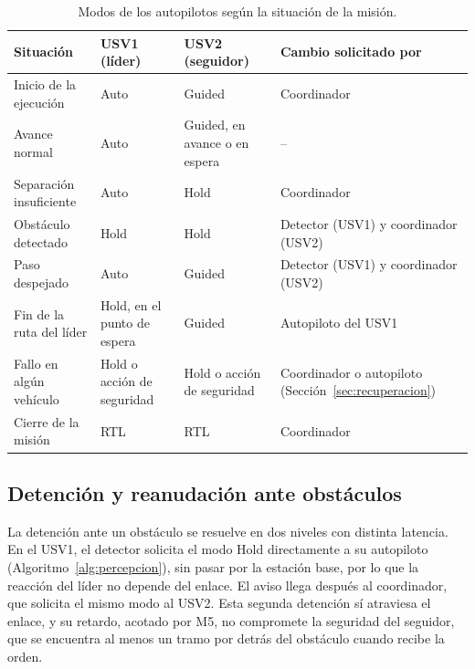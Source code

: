 \begin{table}[!htb]
\centering
\caption{Modos de los autopilotos según la situación de la misión.}
\label{tab:modos_mision}
\small
\begin{tabularx}{\textwidth}{|>{\raggedright\arraybackslash}p{3.6cm}|>{\raggedright\arraybackslash}p{2.5cm}|>{\raggedright\arraybackslash}p{2.5cm}|>{\raggedright\arraybackslash}X|}
\hline
\textbf{Situación} & \textbf{USV1 (líder)} & \textbf{USV2 (seguidor)} & \textbf{Cambio solicitado por} \\ \hline
Inicio de la ejecución & Auto & Guided & Coordinador \\ \hline
Avance normal & Auto & Guided, en avance o en espera & -- \\ \hline
Separación insuficiente & Auto & Hold & Coordinador \\ \hline
Obstáculo detectado & Hold & Hold & Detector (USV1) y coordinador (USV2) \\ \hline
Paso despejado & Auto & Guided & Detector (USV1) y coordinador (USV2) \\ \hline
Fin de la ruta del líder & Hold, en el punto de espera & Guided & Autopiloto del USV1 \\ \hline
Fallo en algún vehículo & Hold o acción de seguridad & Hold o acción de seguridad & Coordinador o autopiloto (Sección~\ref{sec:recuperacion}) \\ \hline
Cierre de la misión & RTL & RTL & Coordinador \\ \hline
\end{tabularx}
\end{table}

\subsection{Detención y reanudación ante obstáculos}
\label{subsec:detencion_obstaculos}

La detención ante un obstáculo se resuelve en dos niveles con distinta latencia. En el USV1, el detector solicita 
el modo Hold directamente a su autopiloto (Algoritmo~\ref{alg:percepcion}), sin pasar por la estación base, por 
lo que la reacción del líder no depende del enlace. El aviso llega después al coordinador, que solicita el mismo 
modo al USV2. Esta segunda detención sí atraviesa el enlace, y su retardo, acotado por M5, no compromete la 
seguridad del seguidor, que se encuentra al menos un tramo por detrás del obstáculo cuando recibe la orden.

